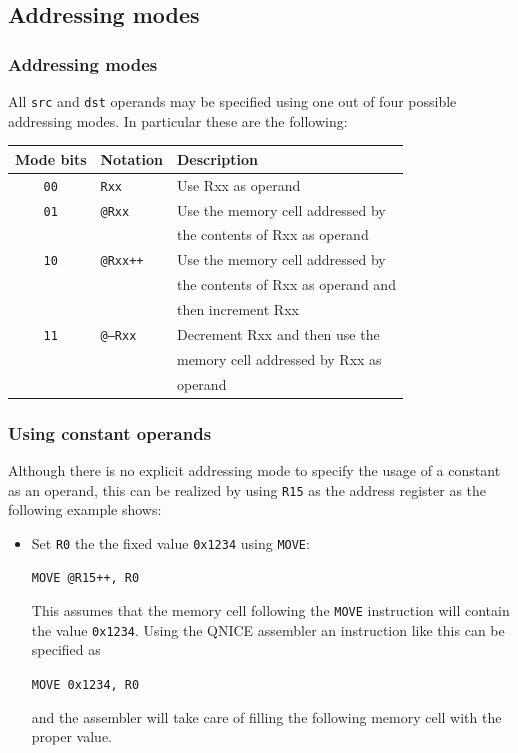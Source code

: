 \documentclass{beamer}
\begin{document}
  \subsection{Addressing modes}
   \begin{frame}
    \frametitle{Addressing modes}
    All {\tt src} and {\tt dst} operands may be specified using one out of 
    four possible addressing modes. In particular these are the following:
    \begin{center}
     \begin{tabular}{|c|l|l|}
      \hline
       Mode bits&Notation&Description\\
      \hline
       {\tt 00}&{\tt Rxx}&Use Rxx as operand\\
       {\tt 01}&{\tt @Rxx}&Use the memory cell addressed by\\
               &          &the contents of Rxx as operand\\
       {\tt 10}&{\tt @Rxx++}&Use the memory cell addressed by\\
               &          &the contents of Rxx as operand and\\
               &          &then increment Rxx\\
       {\tt 11}&{\tt @--Rxx}&Decrement Rxx and then use the\\
               &          &memory cell addressed by Rxx as\\
               &          &operand\\
      \hline
     \end{tabular}
    \end{center}
   \end{frame}
%
   \begin{frame}
    \frametitle{Using constant operands}
    Although there is no explicit addressing mode to specify the usage of
    a constant as an operand, this can be realized by using {\tt R15} as
    the address register as the following example shows:
    \begin{itemize}
     \item Set {\tt R0} the the fixed value {\tt 0x1234} using {\tt MOVE}:
      \begin{center}
       {\tt MOVE @R15++, R0}
      \end{center}
      This assumes that the memory cell following the {\tt MOVE} instruction
      will contain the value {\tt 0x1234}. Using the QNICE assembler an 
      instruction like this can be specified as
      \begin{center}
       {\tt MOVE 0x1234, R0}
      \end{center}
      and the assembler will take care of filling the following memory cell
      with the proper value.
    \end{itemize}
   \end{frame}
\end{document}
